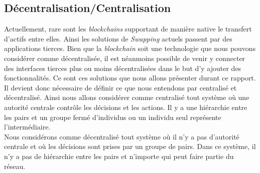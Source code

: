 \subsection{Décentralisation/Centralisation}
Actuellement, rare sont les \textit{\gls{blockchain}s} supportant de manière native le transfert d'\gls{actif}s entre elles. Ainsi les solutions
de \textit{Swapping} actuels passent par des applications tierces. Bien que la \textit{\gls{blockchain}} soit une technologie que nous 
pouvons considérer comme décentralisée, il est néanmoins possible de venir y connecter des interfaces tierces plus ou 
moins décentralisées dans le but d'y ajouter des fonctionnalités. Ce sont ces solutions que nous allons présenter durant ce rapport. \\
Il devient donc nécessaire de définir ce que nous entendons par centralisé et décentralisé. Ainsi nous allons considérer comme
centralisé tout système où une autorité centrale contrôle les décisions et les actions. 
Il y a une hiérarchie entre les pairs et un groupe fermé d’individus ou un individu seul représente l’intermédiaire. \\
Nous considérons comme décentralisé tout système où il n’y a pas d’autorité centrale et où les décisions sont prises 
par un groupe de pairs. Dans ce système, il n’y a pas de hiérarchie entre les pairs et n'importe qui peut faire partie
du réseau.

